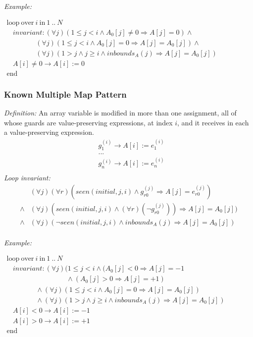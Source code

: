 \documentclass[a4paper,10pt]{article}
\newcommand{\idx}{\ensuremath{i}\xspace}
\newcommand{\idxinitial}{\ensuremath{\mathit{initial}}\xspace}
\newcommand{\at}[1]{{(#1)}}
\newcommand{\KWloop}{\ensuremath{\mathrm{loop}~}}
\newcommand{\KWend}{\ensuremath{\mathrm{end}~}}
\newcommand{\KWover}{\ensuremath{\mathrm{over}~}}
\newcommand{\KWin}{\ensuremath{~\mathrm{in}~}}
\newcommand{\impl}{\ensuremath{\Longrightarrow}}
\newcommand{\inbounds}[2]{\ensuremath{\mathit{inbounds}_{#1}(#2)}\xspace}
\newcommand{\seen}[3]{\ensuremath{\mathit{seen}{(#1,#2,#3)}}\xspace}
\newcommand{\loopinvariant}{\noindent\textit{Loop invariant:}\xspace}
\newcommand{\patterndef}{\noindent\textit{Definition:}\xspace}
\newcommand{\patternexample}{\noindent\textit{Example:}\xspace}
\begin{document}
\bigskip
\patternexample

\medskip
$\begin{array}{l}
  \KWloop \KWover i \KWin 1~..~N \\
  ~~~~ \textit{invariant}: (\forall j)(1 \leq j < i \land A_0[j] \neq 0 \impl A[j] = 0) \land\\
  ~~~~~~~~~~~~~~~~~~~ (\forall j)(1 \leq j < i \land A_0[j] = 0 \impl A[j] = A_0[j]) \land\\
  ~~~~~~~~~~~~~~~~~~~ (\forall j)(1 > j \land j \geq i \land \inbounds{A}{j} \impl A[j] = A_0[j])\\
  ~~~~ A[i] \neq 0 \rightarrow A[i] := 0\\
  \KWend
\end{array}$

\subsubsection*{Known Multiple Map Pattern}

\patterndef An array variable is modified in more than one assignment, all
of whose guards are value-preserving expressions, at index \idx, and it receives in each a
value-preserving expression.
%
\begin{eqnarray*}
&g_1^\at{\idx} \rightarrow A[\idx] := e_1^\at{\idx}\\
&...\\
&g_n^\at{\idx} \rightarrow A[\idx] := e_n^\at{\idx}\\
\end{eqnarray*}
%
\loopinvariant
%
\begin{eqnarray*}
&(\forall j)(\forall r)(\seen{\idxinitial}{j}{\idx} \land g_{r0}^\at{j} \impl A[j] = e_{r0}^\at{j}) \\
\land&(\forall j)(\seen{\idxinitial}{j}{\idx} \land (\forall r) (\neg g_{r0}^\at{j})) \impl A[j] = A_0[j]) \\
\land&
 (\forall j)(\neg \seen{\idxinitial}{j}{\idx} \land \inbounds{A}{j} \impl A[j] = A_0[j])\\
\end{eqnarray*}

\bigskip
\patternexample

\medskip
$\begin{array}{l}
  \KWloop \KWover i \KWin 1~..~N \\
  ~~~~ \textit{invariant}: (\forall j)(1 \leq j < i \land (A_0[j] < 0 \impl A[j] = -1\\
  ~~~~~~~~~~~~~~~~~~~~~~~~~~~~~~~~~~~~~~~ \land (A_0[j] > 0 \impl A[j] = +1)\\
  ~~~~~~~~~~~~~~~~~~~ \land (\forall j)(1 \leq j < i \land A_0[j] = 0 \impl A[j] = A_0[j])\\
  ~~~~~~~~~~~~~~~~~~~ \land (\forall j)(1 > j \land j \geq i \land \inbounds{A}{j} \impl A[j] = A_0[j])\\
  ~~~~ A[i] < 0 \rightarrow A[i] := -1\\
  ~~~~ A[i] > 0 \rightarrow A[i] := +1\\
  \KWend
\end{array}$
\end{document}
